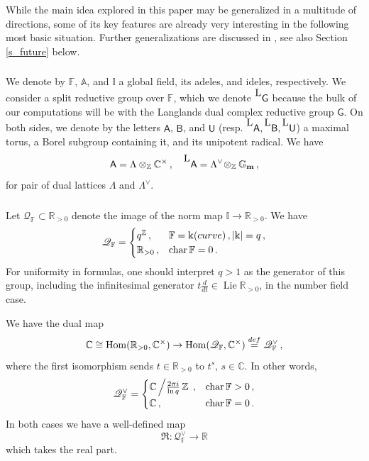 \documentclass[14pt]{extarticle}
\newcommand{\C}{\mathbb{C}}
\newcommand{\Gm}{\mathbb{G}_\mathbf{m}}
\newcommand{\Ct}{\mathbb{C}^\times}
\newcommand{\A}{\mathbb{A}}
\newcommand{\F}{\mathbb{F}}
\newcommand{\I}{\mathbb{I}}
\newcommand{\Z}{\mathbb{Z}}
\newcommand{\R}{\mathbb{R}}
\newcommand{\bA}{\mathsf{A}}
\newcommand{\bG}{\mathsf{G}}
\newcommand{\bU}{\mathsf{U}}
\newcommand{\bB}{\mathsf{B}}
\newcommand{\cQ}{\mathscr{Q}}
\newcommand{\La}{{}^{\raisebox{2pt}{\textup{\tiny\textsf{L}}}}}
\DeclareMathOperator{\Hom}{Hom}
\DeclareMathOperator{\Lie}{Lie}
\DeclareMathOperator{\chr}{char}
\theoremstyle{definition}
\begin{document}
While the main idea explored in this paper may be generalized in a multitude
of directions, some of its key features are already very interesting in
the following most basic situation. Further
generalizations are discussed
in \cites{KO,KO2}, see also Section \ref{s_future} below. 

\subsubsection{}

We denote by $\F$, $\A$, and $\I$ a global field, its adeles, and
ideles, respectively. We consider a split reductive group over $\F$,
which we denote $\La\bG$ because the bulk of our computations will be
with the Langlands dual complex reductive group $\bG$. On both sides,
we denote by the letters $\bA$, $\bB$, and $\bU$
(resp. $\La\bA,\La\bB,\La\bU$) a maximal torus, a
Borel subgroup containing it, and its unipotent radical. We have
\[
\bA = \Lambda \otimes_\Z \Ct \,,
\quad
\La \bA = \Lambda^\vee \!\otimes_\Z \Gm \,, 
\]
for pair of dual lattices $\Lambda$ and $\Lambda^\vee$. 

\subsubsection{}

Let $\cQ_\F \subset \R_{>0}$ denote the image of
the norm map $\I \to \R_{>0}$. We have
%
\begin{equation}
  \cQ_\F =
\begin{cases}
  q^\Z \,, &\F = \Bbbk(\textup{curve})\,, |\Bbbk|=q\,,\\
  \R_{>0}\,, & \chr \F = 0 \,. 
\end{cases}\label{eq:182-7}
\end{equation}
%
For uniformity in formulas, one should interpret $q>1$ as the generator
of this group, including the infinitesimal generator $t\frac{d}{dt} \in \Lie \R_{>0}$,  in the number field case. 


We have the dual map 
\[
  \C \cong\Hom(\R_{>0},\Ct)  \to \Hom(\cQ_\F,\Ct)
\overset{\textup{\tiny def}}=\cQ_\F^\vee \,,
\]
where the first isomorphism sends $t\in \R_{>0}$ to
$t^s$, $s\in \C$. In other words,
%
\begin{equation}
\cQ_\F^\vee =
\begin{cases}
  \C\left/\frac{2\pi i}{\ln q} \, \Z \right. \,, &\chr \F >0 \,,\\
  \C\,, & \chr \F = 0 \,. 
\end{cases}\label{eq:116}
\end{equation}
%
In both cases we have a well-defined map
\[
  \Re: \cQ_\F^\vee \to \R 
\]
which takes the real part. 
\end{document}
